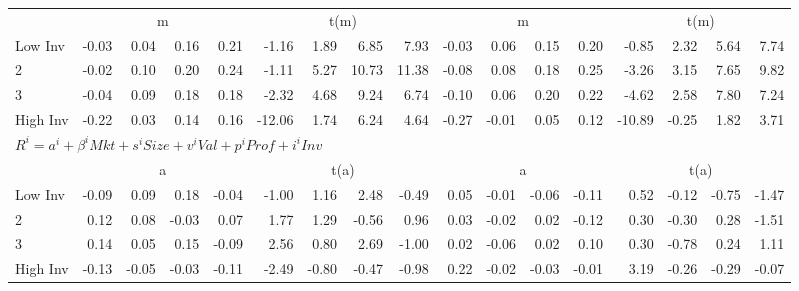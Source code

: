 \begin{tabular}{lrrrrrrrrrrrrrrrr}
  
     & \multicolumn{4}{c}{m} & \multicolumn{4}{c}{t(m)}  & \multicolumn{4}{c}{m} & \multicolumn{4}{c}{t(m)}   \\
     \cmidrule(r){2-5} \cmidrule(r){6-9}  \cmidrule(r){10-13} \cmidrule(r){14-17} 
    Low Inv  & -0.03  & 0.04  & 0.16  & 0.21  & -1.16  & 1.89  & 6.85  & 7.93  & -0.03  & 0.06  & 0.15  & 0.20  & -0.85  & 2.32  & 5.64  & 7.74   \\
    2  & -0.02  & 0.10  & 0.20  & 0.24  & -1.11  & 5.27  & 10.73  & 11.38  & -0.08  & 0.08  & 0.18  & 0.25  & -3.26  & 3.15  & 7.65  & 9.82   \\
    3  & -0.04  & 0.09  & 0.18  & 0.18  & -2.32  & 4.68  & 9.24  & 6.74  & -0.10  & 0.06  & 0.20  & 0.22  & -4.62  & 2.58  & 7.80  & 7.24   \\
    High Inv  & -0.22  & 0.03  & 0.14  & 0.16  & -12.06  & 1.74  & 6.24  & 4.64  & -0.27  & -0.01  & 0.05  & 0.12  & -10.89  & -0.25  & 1.82  & 3.71   \\

  \midrule
  \multicolumn{17}{l}{$R^i=a^i+\beta^iMkt+s^iSize+v^iVal+p^iProf+i^iInv$}  \\
  
     & \multicolumn{4}{c}{a} & \multicolumn{4}{c}{t(a)}  & \multicolumn{4}{c}{a} & \multicolumn{4}{c}{t(a)}   \\
     \cmidrule(r){2-5} \cmidrule(r){6-9}  \cmidrule(r){10-13} \cmidrule(r){14-17} 
    Low Inv  & -0.09  & 0.09  & 0.18  & -0.04  & -1.00  & 1.16  & 2.48  & -0.49  & 0.05  & -0.01  & -0.06  & -0.11  & 0.52  & -0.12  & -0.75  & -1.47   \\
    2  & 0.12  & 0.08  & -0.03  & 0.07  & 1.77  & 1.29  & -0.56  & 0.96  & 0.03  & -0.02  & 0.02  & -0.12  & 0.30  & -0.30  & 0.28  & -1.51   \\
    3  & 0.14  & 0.05  & 0.15  & -0.09  & 2.56  & 0.80  & 2.69  & -1.00  & 0.02  & -0.06  & 0.02  & 0.10  & 0.30  & -0.78  & 0.24  & 1.11   \\
    High Inv  & -0.13  & -0.05  & -0.03  & -0.11  & -2.49  & -0.80  & -0.47  & -0.98  & 0.22  & -0.02  & -0.03  & -0.01  & 3.19  & -0.26  & -0.29  & -0.07   \\




  \bottomrule
\end{tabular}
